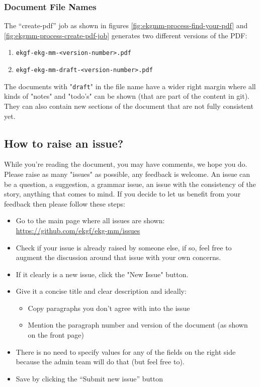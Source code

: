 \subsubsection{Document File Names}
\label{subsec:ekg-mm-process-document-file-names}

The ``create-pdf'' job as shown in figures \ref{fig:ekgmm-process-find-your-pdf}
and \ref{fig:ekgmm-process-create-pdf-job} generates two different versions of the PDF:

\begin{enumerate}[leftmargin=1.2em,font=\footnotesize]
    \item {\footnotesize\texttt{ekgf-ekg-mm-<version-number>.pdf}}
    \item {\footnotesize\texttt{ekgf-ekg-mm-draft-<version-number>.pdf}}
\end{enumerate}

The documents with "\texttt{draft}" in the file name have a wider right margin 
where all kinds of "notes" and "todo’s" can be shown (that are part of the content in git).
They can also contain new sections of the document that are not fully consistent yet.

\subsection{How to raise an issue?}
\label{subsec:ekg-mm-process-how-to-raise-an-issue}

While you’re reading the document, you may have comments, we hope you do.
Please raise as many "issues" as possible, any feedback is welcome.
An issue can be a question, a suggestion, a grammar issue, 
an issue with the consistency of the story, anything that comes to mind. 
If you decide to let us benefit from your feedback then please follow these steps:

\begin{itemize}
    \item Go to the main page where all issues are shown:
          \url{https://github.com/ekgf/ekg-mm/issues}
    \item Check if your issue is already raised by someone else, if so, 
          feel free to augment the discussion around that issue with your own concerns.
    \item If it clearly is a new issue, click the "New Issue" button.
    \item Give it a concise title and clear description and ideally:
    \begin{itemize}
        \item Copy paragraphs you don’t agree with into the issue
        \item Mention the paragraph number and version of the document (as shown on the front page) 
    \end{itemize}
    \item There is no need to specify values for any of the fields on
          the right side because the admin team will do that (but feel free to).
    \item Save by clicking the “Submit new issue” button
\end{itemize}

